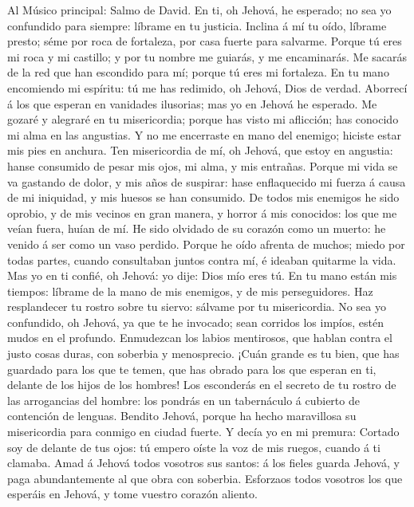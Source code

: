  Al Músico principal: Salmo de David. En ti, oh Jehová, he
esperado; no sea yo confundido para siempre: líbrame en tu justicia.
 Inclina á mí tu oído, líbrame presto; séme por roca de
fortaleza, por casa fuerte para salvarme.  Porque tú eres
mi roca y mi castillo; y por tu nombre me guiarás, y me encaminarás.
 Me sacarás de la red que han escondido para mí; porque tú
eres mi fortaleza.  En tu mano encomiendo mi espíritu: tú
me has redimido, oh Jehová, Dios de verdad.  Aborrecí á
los que esperan en vanidades ilusorias; mas yo en Jehová he esperado.
 Me gozaré y alegraré en tu misericordia; porque has visto
mi aflicción; has conocido mi alma en las angustias.  Y no
me encerraste en mano del enemigo; hiciste estar mis pies en anchura.
 Ten misericordia de mí, oh Jehová, que estoy en angustia:
hanse consumido de pesar mis ojos, mi alma, y mis entrañas.
 Porque mi vida se va gastando de dolor, y mis años de
suspirar: hase enflaquecido mi fuerza á causa de mi iniquidad, y mis
huesos se han consumido.  De todos mis enemigos he sido
oprobio, y de mis vecinos en gran manera, y horror á mis conocidos: los
que me veían fuera, huían de mí.  He sido olvidado de su
corazón como un muerto: he venido á ser como un vaso perdido.
 Porque he oído afrenta de muchos; miedo por todas
partes, cuando consultaban juntos contra mí, é ideaban quitarme la vida.
 Mas yo en ti confié, oh Jehová: yo dije: Dios mío eres
tú.  En tu mano están mis tiempos: líbrame de la mano de
mis enemigos, y de mis perseguidores.  Haz resplandecer
tu rostro sobre tu siervo: sálvame por tu misericordia. 
No sea yo confundido, oh Jehová, ya que te he invocado; sean corridos
los impíos, estén mudos en el profundo.  Enmudezcan los
labios mentirosos, que hablan contra el justo cosas duras, con soberbia
y menosprecio.  ¡Cuán grande es tu bien, que has guardado
para los que te temen, que has obrado para los que esperan en ti,
delante de los hijos de los hombres!  Los esconderás en
el secreto de tu rostro de las arrogancias del hombre: los pondrás en un
tabernáculo á cubierto de contención de lenguas.  Bendito
Jehová, porque ha hecho maravillosa su misericordia para conmigo en
ciudad fuerte.  Y decía yo en mi premura: Cortado soy de
delante de tus ojos: tú empero oíste la voz de mis ruegos, cuando á ti
clamaba.  Amad á Jehová todos vosotros sus santos: á los
fieles guarda Jehová, y paga abundantemente al que obra con soberbia.
 Esforzaos todos vosotros los que esperáis en Jehová, y
tome vuestro corazón aliento.

